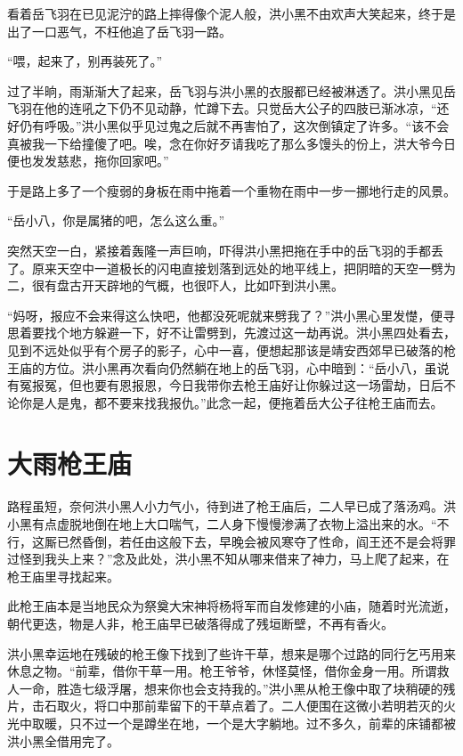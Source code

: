看着岳飞羽在已见泥泞的路上摔得像个泥人般，洪小黑不由欢声大笑起来，终于是出了一口恶气，不枉他追了岳飞羽一路。

“喂，起来了，别再装死了。”

过了半晌，雨渐渐大了起来，岳飞羽与洪小黑的衣服都已经被淋透了。洪小黑见岳飞羽在他的连吼之下仍不见动静，忙蹲下去。只觉岳大公子的四肢已渐冰凉，“还好仍有呼吸。”洪小黑似乎见过鬼之后就不再害怕了，这次倒镇定了许多。“该不会真被我一下给撞傻了吧。唉，念在你好歹请我吃了那么多馒头的份上，洪大爷今日便也发发慈悲，拖你回家吧。”

于是路上多了一个瘦弱的身板在雨中拖着一个重物在雨中一步一挪地行走的风景。

“岳小八，你是属猪的吧，怎么这么重。”

突然天空一白，紧接着轰隆一声巨响，吓得洪小黑把拖在手中的岳飞羽的手都丢了。原来天空中一道极长的闪电直接划落到远处的地平线上，把阴暗的天空一劈为二，很有盘古开天辟地的气概，也很吓人，比如吓到洪小黑。

“妈呀，报应不会来得这么快吧，他都没死呢就来劈我了？”洪小黑心里发憷，便寻思着要找个地方躲避一下，好不让雷劈到，先渡过这一劫再说。洪小黑四处看去，见到不远处似乎有个房子的影子，心中一喜，便想起那该是靖安西郊早已破落的枪王庙的方位。洪小黑再次看向仍然躺在地上的岳飞羽，心中暗到：“岳小八，虽说有冤报冤，但也要有恩报恩，今日我带你去枪王庙好让你躲过这一场雷劫，日后不论你是人是鬼，都不要来找我报仇。”此念一起，便拖着岳大公子往枪王庙而去。


\chapter{大雨枪王庙}
\label{chap:da-yu-qiang-wang-miao}


路程虽短，奈何洪小黑人小力气小，待到进了枪王庙后，二人早已成了落汤鸡。洪小黑有点虚脱地倒在地上大口喘气，二人身下慢慢渗满了衣物上溢出来的水。“不行，这厮已然昏倒，若任由这般下去，早晚会被风寒夺了性命，阎王还不是会将罪过怪到我头上来？”念及此处，洪小黑不知从哪来借来了神力，马上爬了起来，在枪王庙里寻找起来。

此枪王庙本是当地民众为祭奠大宋神将杨将军而自发修建的小庙，随着时光流逝，朝代更迭，物是人非，枪王庙早已破落得成了残垣断壁，不再有香火。

洪小黑幸运地在残破的枪王像下找到了些许干草，想来是哪个过路的同行乞丐用来休息之物。“前辈，借你干草一用。枪王爷爷，休怪莫怪，借你金身一用。所谓救人一命，胜造七级浮屠，想来你也会支持我的。”洪小黑从枪王像中取了块稍硬的残片，击石取火，将口中那前辈留下的干草点着了。二人便围在这微小若明若灭的火光中取暖，只不过一个是蹲坐在地，一个是大字躺地。过不多久，前辈的床铺都被洪小黑全借用完了。